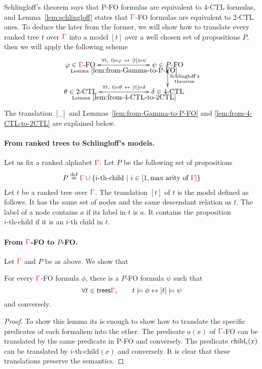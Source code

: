 Schlingloff's theorem says that P-FO formulas are equivalent to 4-CTL formulas, and  Lemma~\ref{lem:schlingloff} states that ${\color{red}{\Gamma}}$-FO formulas are equivalent to 2-CTL ones. To deduce the later from the former, we will show how to translate every ranked tree $t$ over ${\color{red}{\Gamma}}$ into a model $[t]$ over a well chosen set of propositions $P$, then we will apply the following scheme
    $$\xymatrix@C=2.5cm{
        \varphi \in \rGamma\text{-FO} 
        \ar@{<->}[r]^{\forall t, \ t\models \varphi \ \leftrightarrow \ [t] \models \psi}_{\text{Lemma}~\ref{lem:from-Gamma-to-P-FO}}
        &
        \psi \in P \text{-FO}
        \ar@{<->}[d]^{\substack{\text{Schlingloff's}\\\text{theorem}}} \\
       \theta \in \text{2-CTL}
        \ar@{<->}[r]^{\forall t, \ t\models \theta \ \leftrightarrow \ [t] \models \delta}_{\text{Lemma}~\ref{lem:from-4-CTL-to-2CTL}}
        &
        \delta \in \text{4-CTL}
    }$$    
The translation $[\_]$ and Lemmas~\ref{lem:from-Gamma-to-P-FO} and \ref{lem:from-4-CTL-to-2CTL} are explained below.

\paragraph{From ranked trees to Schlingloff's models.} Let us fix a ranked alphabet ${\color{red}{\Gamma}}$. Let $P$ be the following set of propositions
\begin{align*}
P\stackrel{\text{def}}= {\color{red}{\Gamma}}\cup\{i\text{-th-child}\ |\ i\in[1, \text{max arity of }{\color{red}{\Gamma}}]\}
\end{align*}
 Let $t$ be a ranked tree over ${\color{red}{\Gamma}}$. The translation $[t]$ of $t$ is the model defined as follows. It has the same set of nodes and the same descendant relation as $t$. The label of a node contains $a$ if its label in $t$ is $a$. It contains the proposition $i\text{-th-child}$ if it is an $i$-th child in $t$.

\paragraph{From ${\color{red}{\Gamma}}$-FO to $P$-FO.} Let ${\color{red}{\Gamma}}$ and $P$ be as above. We show that
\begin{lemma}\label{lem:from-Gamma-to-P-FO}
For every ${\color{red}{\Gamma}}$-FO formula $\phi$, there is a $P$-FO formula $\psi$ such that
$$ \forall t\in \mathsf {trees}{\color{red}{\Gamma}}, \qquad t\models \phi \leftrightarrow [t]\models \psi$$
and conversely.
\end{lemma}
\begin{proof}
To show this lemma its is enough to show how to translate the specific predicates of each formalism into the other. The predicate $a(x)$ of ${\color{red}{\Gamma}}$-FO can be translated by the same predicate in P-FO and conversely. The predicate $\mathrm{child}_{i}(x)$ can be translated by $i\text{-th-child}(x)$ and conversely.  It is clear that these translations preserve the semantics.
\end{proof}

